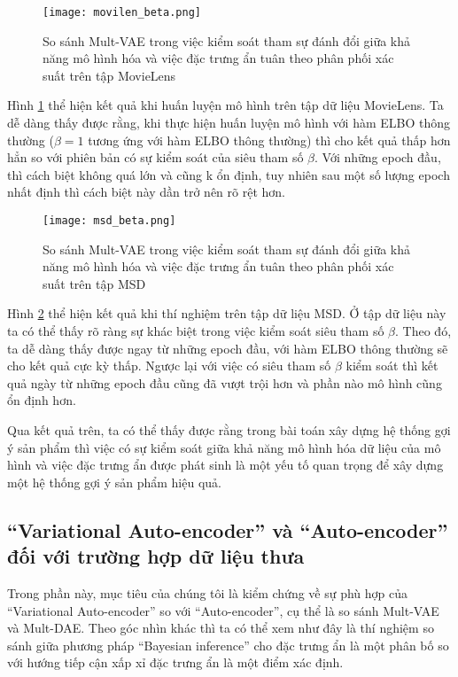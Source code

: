    \begin{figure}
    \centering
    \texttt{[image: movilen\_beta.png]}
    \caption[Mô hình Mult-VAE trong việc kiểm soát siêu tham số]{So sánh Mult-VAE trong việc kiểm soát tham sự đánh đổi giữa khả năng mô hình hóa và việc đặc trưng ẩn tuân theo phân phối xác suất trên tập MovieLens}
    \label{beta_movielen}
    \end{figure}

    Hình \ref{beta_movielen} thể hiện kết quả khi huấn luyện mô hình trên tập dữ liệu MovieLens.
    Ta dễ dàng thấy được rằng, khi thực hiện huấn luyện mô hình với hàm ELBO thông thường ($\beta=1$ tương ứng với hàm ELBO thông thường) thì cho kết quả thấp hơn hẳn so với phiên bản có sự kiểm soát của siêu tham số $\beta$.
    Với những epoch đầu, thì cách biệt không quá lớn và cũng k ổn định, tuy nhiên sau một số lượng epoch nhất định thì cách biệt này dần trở nên rõ rệt hơn.

    \begin{figure}
        \centering
        \texttt{[image: msd\_beta.png]}
        \caption[Mô hình Mult-VAE trong việc kiểm soát siêu tham số]{So sánh Mult-VAE trong việc kiểm soát tham sự đánh đổi giữa khả năng mô hình hóa và việc đặc trưng ẩn tuân theo phân phối xác suất trên tập MSD}
        \label{beta_msd}
    \end{figure}


    
    Hình \ref{beta_msd} thể hiện kết quả khi thí nghiệm trên tập dữ liệu MSD. 
    Ở tập dữ liệu này ta có thể thấy rõ ràng sự khác biệt trong việc kiểm soát siêu tham số $\beta$.
    Theo đó, ta dễ dàng thấy được ngay từ những epoch đầu, với hàm ELBO thông thường sẽ cho kết quả cực kỳ thấp. 
    Ngược lại với việc có siêu tham số $\beta$ kiểm soát thì kết quả ngày từ những epoch đầu cũng đã vượt trội hơn và phần nào mô hình cũng ổn định hơn. 

    Qua kết quả trên, ta có thể thấy được rằng trong bài toán xây dựng hệ thống gợi ý sản phẩm thì việc có sự kiểm soát giữa khả năng mô hình hóa dữ liệu của mô hình và việc đặc trưng ẩn được phát sinh là một yếu tố quan trọng để xây dựng một hệ thống gợi ý sản phẩm hiệu quả.



   
    \subsection{``Variational Auto-encoder'' và ``Auto-encoder'' đối với trường hợp dữ liệu thưa}
    Trong phần này, mục tiêu của  chúng tôi là kiểm chứng về sự phù hợp của ``Variational Auto-encoder'' so với ``Auto-encoder'', cụ thể là so sánh Mult-VAE và Mult-DAE.
    Theo góc nhìn khác thì ta có thể xem như đây là thí nghiệm so sánh giữa phương pháp ``Bayesian inference'' cho đặc trưng ẩn là một phân bố so với hướng tiếp cận xấp xỉ đặc trưng ẩn là một điểm xác định.

